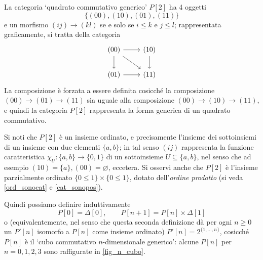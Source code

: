 \begin{example}\label{ex_quadcuboncubo}
	La categoria `quadrato commutativo generico' \(P[2]\) ha 4 oggetti
	\[\{(00),(10),(01),(11)\} \]
	e un morfismo \((ij)\to(kl)\) se e solo se \(i\le k\) e \(j\le l\); rappresentata graficamente, si tratta della categoria
	\[\begin{tikzcd}
			(00) \ar[r]\ar[d]\ar[dr]& (10)\ar[d] \\
			(01) \ar[r]& (11)
		\end{tikzcd}\]
	La composizione è forzata a essere definita cosicché la composizione \((00)\to (01)\to (11)\) sia uguale alla composizione \((00)\to (10)\to (11)\), e quindi la categoria \(P[2]\) rappresenta la forma generica di un quadrato commutativo.

	Si noti che \(P[2]\) è un insieme ordinato, e precisamente l'insieme dei sottoinsiemi di un insieme con due elementi \(\{a,b\}\); in tal senso \((ij)\) rappresenta la funzione caratteristica \(\chi_U : \{a,b\}\to \{0,1\}\) di un sottoinsieme \(U\subseteq \{a,b\}\), nel senso che ad esempio \((10)=\{a\}, (00)=\varnothing\), eccetera. Si osservi anche che \(P[2]\) è l'insieme parzialmente ordinato \(\{0\le 1\}\times \{0\le 1\}\), dotato dell'\emph{ordine prodotto} (si veda \ref{ord_sonocat} e \ref{cat_sonopos}).

	Quindi possiamo definire induttivamente
	\[P[0] = \Delta[0], \qquad P[n+1] = P[n]\times \Delta[1]\]
	o (equivalentemente, nel senso che questa seconda definizione dà per ogni \(n\ge 0\) un \(P'[n]\) isomorfo a \(P[n]\) come insieme ordinato) \(P'[n] = 2^{\{1,\dots,n\}}\), cosicché \(P[n]\) è il `cubo commutativo \(n\)-dimensionale generico': alcune \(P[n]\) per \(n=0,1,2,3\) sono raffigurate in \ref{fig_n_cubo}.
\end{example}
